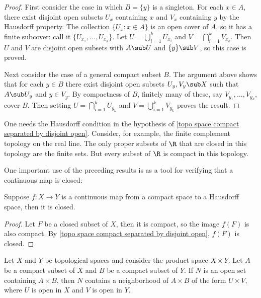 \begin{proof}
First consider the case in which $B=\{y\}$ is a singleton. For each $x\in A$, there exist disjoint open subsets $U_x$ containing $x$ and $V_x$ containing $y$ by the Hausdorff property. The collection $\{U_x:x\in A\}$ is an open cover of $A$, so it has a finite subcover: call it $\{U_{x_1},\dots,U_{x_k}\}$. Let $U=\bigcup_{i=1}^{k}U_{x_i}$ and $V=\bigcap_{i=1}^{k}V_{x_k}$. Then $U$ and $V$ are disjoint open subsets with $A\sub U$ and $\{y\}\sub V$, so this case is proved.\par
Next consider the case of a general compact subset $B$. The argument above shows that for each $y\in B$ there exist disjoint open subsets $U_y,V_y\sub X$ such that $A\sub U_y$ and $y\in V_y$. By compactness of $B$, finitely many of these, say $V_{y_1},\dots,V_{y_k}$, cover $B$. Then setting $U=\bigcap_{i=1}^{k}U_{y_k}$ and $V=\bigcup_{i=1}^{k}V_{y_k}$ proves the result.
\end{proof}
\begin{example}
One needs the Hausdorff condition in the hypothesis of \cref{topo space compact separated by disjoint open}. Consider, for example, the finite complement topology on the real line. The only proper subsets of $\R$ that are closed in this topology are the finite sets. But every subset of $\R$ is compact in this topology.
\end{example}
One important use of the preceding results is as a tool for verifying that a continuous map is closed:
\begin{theorem}
Suppose $f:X\to Y$ is a continuous map from a compact space to a Hausdorff space, then it is closed.
\end{theorem}
\begin{proof}
Let $F$ be a closed subset of $X$, then it is compact, so the image $f(F)$ is also compact. By \cref{topo space compact separated by disjoint open}, $f(F)$ is closed.
\end{proof}
\begin{lemma}
Let $X$ and $Y$ be topological spaces and consider the product space $X\times Y$. Let $A$ be a compact subset of $X$ and $B$ be a compact subset of $Y$. If $N$ is an open set containing $A\times B$, then $N$ contains a neighborhood of $A\times B$ of the form $U\times V$, where $U$ is open in $X$ and $V$ is open in $Y$.
\end{lemma}
